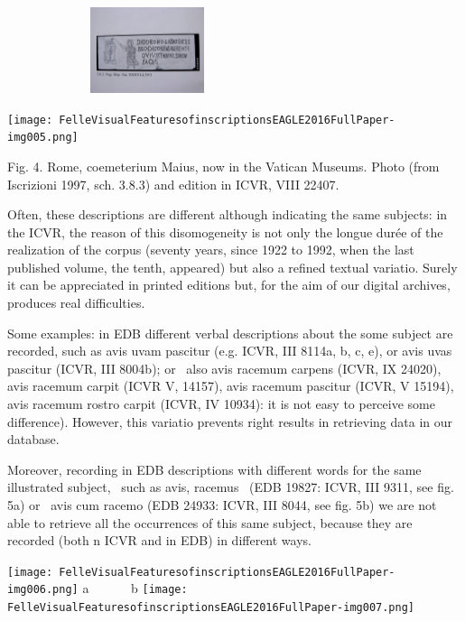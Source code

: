 \documentclass[amsthm,ebook]{saparticle}
\begin{document}
\bigskip


\bigskip


\bigskip


\bigskip


\bigskip

 \includegraphics[width=8.202cm,height=2.514cm]{FelleVisualFeaturesofinscriptionsEAGLE2016FullPaper-img004.png} 

 \texttt{[image: FelleVisualFeaturesofinscriptionsEAGLE2016FullPaper-img005.png]} 

Fig. 4. Rome, coemeterium Maius, now in the Vatican Museums. Photo (from Iscrizioni 1997, sch. 3.8.3) and edition in
ICVR, VIII 22407.


\bigskip

Often, these descriptions are different although indicating the same subjects: in the ICVR, the reason of this
disomogeneity is not only the longue durée of the realization of the corpus (seventy years, since 1922 to 1992, when
the last published volume, the tenth, appeared) but also a refined textual variatio. Surely it can be appreciated in
printed editions but, for the aim of our digital archives, produces real difficulties. 

Some examples: in EDB different verbal descriptions about the some subject are recorded, such as avis uvam pascitur
(e.g. ICVR, III 8114a, b, c, e), or avis uvas pascitur (ICVR, III 8004b); or \ also avis racemum carpens (ICVR, IX
24020), avis racemum carpit (ICVR V, 14157), avis racemum pascitur (ICVR, V 15194), avis racemum rostro carpit (ICVR,
IV 10934): it is not easy to perceive some difference). However, this variatio prevents right results in retrieving
data in our database. 

Moreover, recording in EDB descriptions with different words for the same illustrated subject, \ such as
{\textquotedbl}avis, racemus{\textquotedbl} \ (EDB 19827: ICVR, III 9311, see fig. 5a) or \ {\textquotedbl}avis cum
racemo{\textquotedbl} (EDB 24933: ICVR, III 8044, see fig. 5b) we are not able to retrieve all the occurrences of this
same subject, because they are recorded (both n ICVR and in EDB) in different ways.


\bigskip

 \texttt{[image: FelleVisualFeaturesofinscriptionsEAGLE2016FullPaper-img006.png]}  a
\ \ \ \ \ \ b 
\texttt{[image: FelleVisualFeaturesofinscriptionsEAGLE2016FullPaper-img007.png]} 
\end{document}
